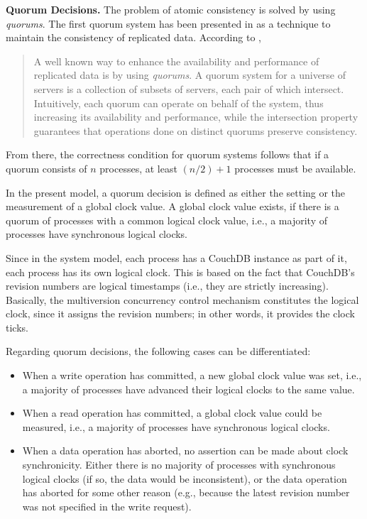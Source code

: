 \noindent
{\bf Quorum Decisions.}
The problem of atomic consistency is solved by using \emph{quorums}. The first quorum system has been presented in \cite{Gif79} as a technique to maintain the consistency of replicated data. According to \cite{MR97},
\begin{quote}
    A well known way to enhance the availability and performance
    of replicated data is by using \emph{quorums}. A quorum system
    for a universe of servers is a collection of subsets of
    servers, each pair of which intersect. Intuitively, each
    quorum can operate on behalf of the system, thus increasing its
    availability and performance, while the intersection property
    guarantees that operations done on distinct quorums preserve
    consistency.
\end{quote}

From there, the correctness condition for quorum systems follows that if a quorum consists of $n$ processes, at least $(n / 2) + 1$ processes must be available.

In the present model, a quorum decision is defined as either the setting or the measurement of a global clock value. A global clock value exists, if there is a quorum of processes with a common logical clock value, i.e., a majority of processes have synchronous logical clocks.

Since in the system model, each process has a CouchDB instance as part of it, each process has its own logical clock. This is based on the fact that CouchDB's revision numbers are logical timestamps (i.e., they are strictly increasing). Basically, the multiversion concurrency control mechanism constitutes the logical clock, since it assigns the revision numbers; in other words, it provides the clock ticks.

Regarding quorum decisions, the following cases can be differentiated:
\begin{itemize}
    \item When a write operation has committed, a new global clock value was set, i.e., a majority of processes have advanced their logical clocks to the same value.
    \item When a read operation has committed, a global clock value could be measured, i.e., a majority of processes have synchronous logical clocks.
    \item When a data operation has aborted, no assertion can be made about clock synchronicity. Either there is no majority of processes with synchronous logical clocks (if so, the data would be inconsistent), or the data operation has aborted for some other reason (e.g., because the latest revision number was not specified in the write request).
\end{itemize}

